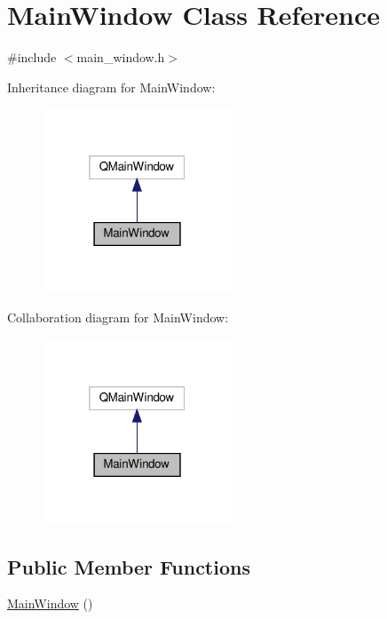 \hypertarget{classMainWindow}{}\section{Main\+Window Class Reference}
\label{classMainWindow}


{\ttfamily \#include $<$main\+\_\+window.\+h$>$}



Inheritance diagram for Main\+Window\+:\nopagebreak
\begin{figure}[H]
\begin{center}
\leavevmode
\includegraphics[width=160pt]{classMainWindow__inherit__graph}
\end{center}
\end{figure}


Collaboration diagram for Main\+Window\+:\nopagebreak
\begin{figure}[H]
\begin{center}
\leavevmode
\includegraphics[width=160pt]{classMainWindow__coll__graph}
\end{center}
\end{figure}
\subsection*{Public Member Functions}
\begin{DoxyCompactItemize}
\item 
\hyperlink{classMainWindow_a34c4b4207b46d11a4100c9b19f0e81bb}{Main\+Window} ()
\end{DoxyCompactItemize}


